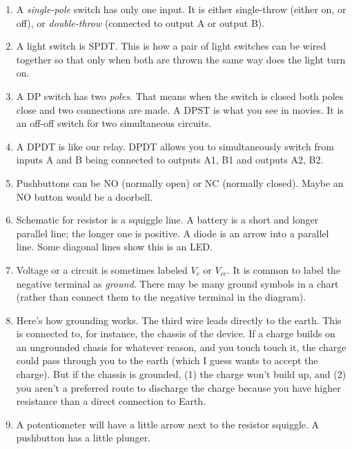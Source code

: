 \documentclass[11pt, oneside]{amsart}
\begin{document}
\begin{enumerate}
  \item A \emph{single-pole} switch has only one input. It is either
  single-throw (either on, or off), or \emph{double-throw} (connected to
  output A or output B).

  \item A light switch is SPDT. This is how a pair of light switches can
  be wired together so that only when both are thrown the same way does
  the light turn on.

  \item A DP switch has two \emph{poles}. That means when the switch is
  closed both poles close and two connections are made. A DPST is what
  you see in movies. It is an off-off switch for two simultaneous
  circuits.

  \item A DPDT is like our relay. DPDT allows you to simultaneously
  switch from inputs A and B being connected to outputs A1, B1 and
  outputs A2, B2.

  \item Pushbuttons can be NO (normally open) or NC (normally closed).
  Maybe an NO button would be a doorbell.

  \item Schematic for resistor is a squiggle line. A battery is a short
  and longer parallel line; the longer one is positive. A diode is an
  arrow into a parallel line. Some diagonal lines show this is an LED.

  \item Voltage or a circuit is sometimes labeled $V_c$ or $V_{cc}$. It
  is common to label the negative terminal as \emph{ground}. There may
  be many ground symbols in a chart (rather than connect them to the
  negative terminal in the diagram).

  \item Here's how grounding works. The third wire leads directly to the
  earth. This is connected to, for instance, the chassis of the device.
  If a charge builds on an ungrounded chasis for whatever reason, and
  you touch touch it, the charge could pass through you to the earth
  (which I guess wants to accept the charge). But if the chassis is
  grounded, (1) the charge won't build up, and (2) you aren't a
  preferred route to discharge the charge because you have higher
  resistance than a direct connection to Earth.

  \item A potentiometer will have a little arrow next to the resistor
  squiggle. A pushbutton has a little plunger.


\end{enumerate}
\end{document}
